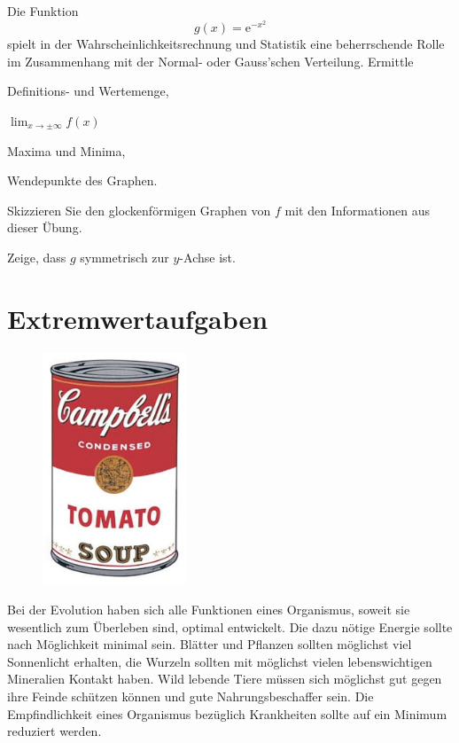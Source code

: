 \documentclass[%
11pt,%
twoside,%
titlepage,%
german,%
headsepline%
]{scrartcl}
\begin{document}
\begin{ueb}[Glockenkurve]
Die
Funktion
$$g(x)=\mathrm{e}^{-x^2}$$
spielt in der Wahrscheinlichkeitsrechnung und Statistik eine beherrschende Rolle im Zusammenhang mit der Normal- oder Gauss'schen Verteilung. Ermittle
\begin{enumeratea}
\item Definitions- und Wertemenge,
\item $\lim_{x\to\pm\infty}f(x)$
\item Maxima und Minima,
\item Wendepunkte des Graphen.
\item Skizzieren Sie den glockenf\"ormigen Graphen von $f$ mit den Informationen aus dieser \"Ubung.
\item Zeige, dass $g$ symmetrisch zur $y$-Achse ist.
\end{enumeratea}
\end{ueb}

\clearpage

\section{Extremwertaufgaben}
\begin{figure}
\vspace{-22pt}
  \begin{center}
    \includegraphics[width=0.382\textwidth]{pictures/can}
  \end{center}
\vspace{-10pt}
\end{figure}
Bei der Evolution haben sich alle Funktionen eines Organismus, soweit sie wesentlich zum \"Uberleben sind, optimal entwickelt. Die dazu n\"otige Energie sollte nach M\"oglichkeit minimal sein. Bl\"atter und Pflanzen sollten m\"oglichst viel Sonnenlicht erhalten, die Wurzeln sollten mit m\"oglichst vielen lebenswichtigen Mineralien Kontakt haben. Wild lebende Tiere m\"ussen sich m\"oglichst gut gegen ihre Feinde sch\"utzen k\"onnen und gute Nahrungsbeschaffer sein. Die Empfindlichkeit eines Organismus bez\"uglich Krankheiten sollte auf ein Minimum reduziert werden.
\end{document}
